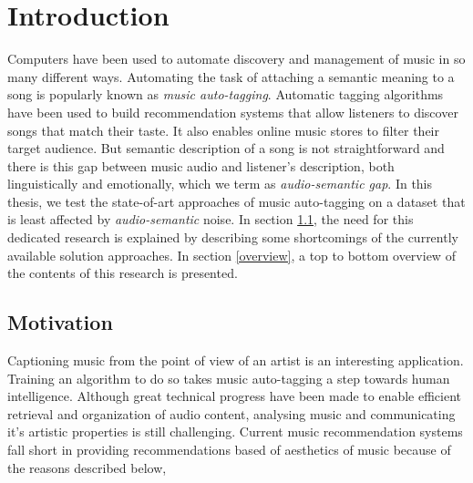 

\chapter{Introduction} %

\label{Chapter1} %


\newcommand{\keyword}[1]{\textbf{#1}}
\newcommand{\tabhead}[1]{\textbf{#1}}
\newcommand{\code}[1]{\texttt{#1}}
\newcommand{\file}[1]{\texttt{\bfseries#1}}
\newcommand{\option}[1]{\texttt{\itshape#1}}



Computers have been used to automate discovery and management of music in so many different ways. Automating the task of attaching a semantic meaning to a song is popularly known as \textit{music auto-tagging}. Automatic tagging algorithms have been used to build recommendation systems that allow listeners to discover songs that match their taste. It also enables online music stores to filter their target audience. But semantic description of a song is not straightforward and there is this gap between music audio and listener's description, both linguistically and emotionally, which we term as \textit{audio-semantic gap}. In this thesis, we test the state-of-art approaches of music auto-tagging on a dataset that is least affected by \textit{audio-semantic} noise. In section \ref{motivation}, the need for this dedicated research is explained by describing some shortcomings of the currently available solution approaches. In section \ref{overview}, a top to bottom overview of the contents of this research is presented.   


\section{Motivation}
\label{motivation}
Captioning music from the point of view of an artist is an interesting application. Training an algorithm to do so takes music auto-tagging a step towards human intelligence. Although great technical progress have been made to enable efficient retrieval and organization of audio content, analysing music and communicating it's artistic properties is still challenging. Current music recommendation systems fall short in providing recommendations based of aesthetics of music because of the reasons described below,
  

